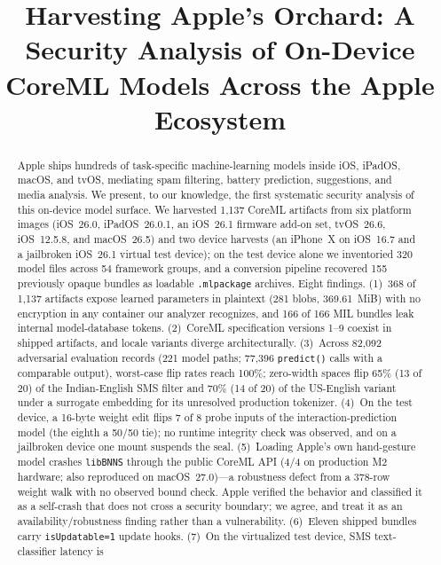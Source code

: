 \documentclass[letterpaper,twocolumn,10pt]{article}
\newcommand{\mlpackage}{\texttt{.mlpackage}\xspace}
\begin{document}
\title{Harvesting Apple's Orchard: A Security Analysis of On-Device CoreML Models Across the Apple Ecosystem}

\maketitle

\begin{abstract}
Apple ships hundreds of task-specific machine-learning models inside iOS,
iPadOS, macOS, and tvOS, mediating spam filtering, battery prediction,
suggestions, and media analysis.
We present, to our knowledge, the first systematic security analysis of
this on-device model surface.
We harvested 1{,}137 CoreML artifacts from six platform images (iOS~26.0,
iPadOS~26.0.1, an iOS~26.1 firmware add-on set,
tvOS~26.6, iOS~12.5.8, and macOS~26.5) and two device harvests (an
iPhone~X on iOS~16.7 and a jailbroken iOS~26.1 virtual test device); on
the test device alone we inventoried 320 model files across 54 framework
groups, and a conversion pipeline recovered 155 previously opaque bundles
as loadable \mlpackage{} archives. Eight findings.
(1)~368 of 1{,}137 artifacts expose learned parameters in plaintext (281
blobs, 369.61~MiB) with no encryption in any container our analyzer
recognizes, and 166 of 166 MIL bundles leak internal model-database tokens.
(2)~CoreML specification versions 1--9 coexist in shipped artifacts,
and locale variants diverge architecturally.
(3)~Across 82{,}092 adversarial evaluation records (221 model paths;
77{,}396 \texttt{predict()} calls with a comparable output), worst-case
flip rates reach 100\%; zero-width spaces flip 65\% (13 of 20)
of the Indian-English SMS filter and 70\% (14 of 20) of the US-English
variant under a surrogate embedding for its unresolved production
tokenizer.
(4)~On the test device, a 16-byte weight edit flips 7 of 8 probe inputs of
the interaction-prediction model (the eighth a 50/50 tie); no runtime
integrity check was observed, and on a jailbroken device one mount
suspends the seal.
(5)~Loading Apple's own hand-gesture model crashes \texttt{libBNNS} through
the public CoreML API (4/4 on production M2 hardware; also reproduced on
macOS~27.0)---a robustness defect from a 378-row weight walk with no
observed bound check. Apple verified the behavior and classified it as a
self-crash that does not cross a security boundary; we agree, and treat it
as an availability/robustness finding rather than a vulnerability.
(6)~Eleven shipped bundles carry \texttt{isUpdatable=1} update hooks.
(7)~On the virtualized test device, SMS text-classifier latency is

\end{abstract}
\end{document}
